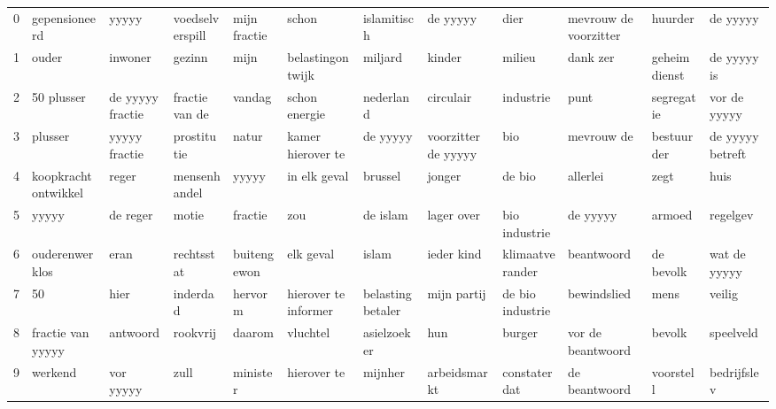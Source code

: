 \begin{tabular}{llllllllllll}
\toprule
0 &        gepensioneerd &             yyyyy &  voedselverspill &  mijn fractie &                 schon &       islamitisch &             de yyyyy &              dier &  mevrouw de voorzitter &        huurder &          de yyyyy \\
1 &                ouder &           inwoner &           gezinn &          mijn &      belastingontwijk &           miljard &               kinder &            milieu &               dank zer &  geheim dienst &       de yyyyy is \\
2 &           50 plusser &  de yyyyy fractie &   fractie van de &        vandag &         schon energie &         nederland &            circulair &         industrie &                   punt &     segregatie &      vor de yyyyy \\
3 &              plusser &     yyyyy fractie &      prostitutie &         natur &     kamer hierover te &          de yyyyy &  voorzitter de yyyyy &               bio &             mevrouw de &     bestuurder &  de yyyyy betreft \\
4 &  koopkrachtontwikkel &             reger &     mensenhandel &         yyyyy &          in elk geval &           brussel &               jonger &            de bio &               allerlei &           zegt &              huis \\
5 &                yyyyy &          de reger &            motie &       fractie &                   zou &          de islam &           lager over &     bio industrie &               de yyyyy &         armoed &          regelgev \\
6 &       ouderenwerklos &              eran &       rechtsstat &   buitengewon &             elk geval &             islam &           ieder kind &   klimaatverander &             beantwoord &      de bevolk &      wat de yyyyy \\
7 &                   50 &              hier &         inderdad &       hervorm &  hierover te informer &  belastingbetaler &          mijn partij &  de bio industrie &            bewindslied &           mens &            veilig \\
8 &    fractie van yyyyy &          antwoord &         rookvrij &        daarom &              vluchtel &       asielzoeker &                  hun &            burger &      vor de beantwoord &         bevolk &         speelveld \\
9 &              werkend &         vor yyyyy &             zull &      minister &           hierover te &           mijnher &         arbeidsmarkt &     constater dat &          de beantwoord &      voorstell &       bedrijfslev \\
\bottomrule
\end{tabular}
